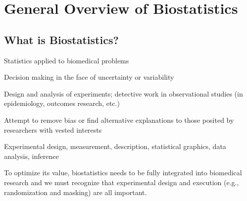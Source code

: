 \chapter{General Overview of Biostatistics}    \label{chap:overview}



\section{What is Biostatistics?}\label{sec:overview-biostat}
\bi
\item Statistics applied to biomedical problems
\item Decision making in the face of uncertainty or variability
\item Design and analysis of experiments; detective work in
  observational studies (in epidemiology, outcomes research, etc.)
\item Attempt to remove bias or find alternative explanations to those
  posited by researchers with vested interests
\item Experimental design, measurement, description, statistical graphics,
  data analysis, inference
\ei

To optimize its value, biostatistics needs to be fully integrated into
biomedical research and we must recognize that experimental design and
execution (e.g., randomization and masking) are all important.

